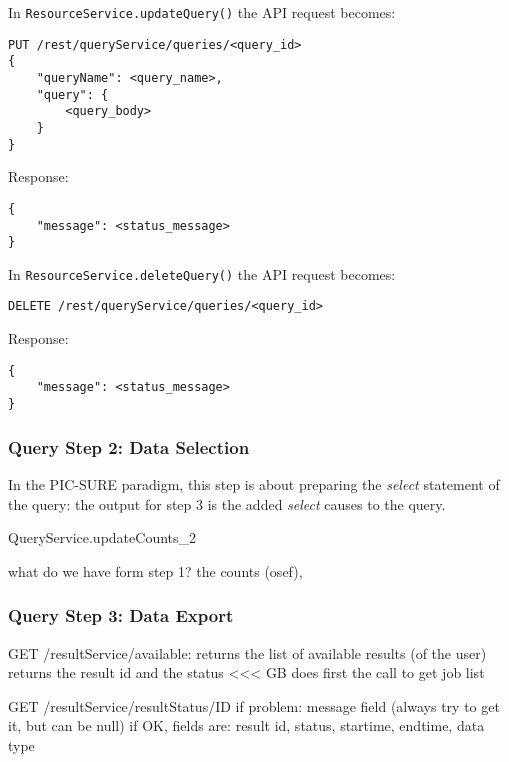 In  \verb|ResourceService.updateQuery()| the API request becomes:
\begin{verbatim}
PUT /rest/queryService/queries/<query_id>
{
    "queryName": <query_name>,
    "query": {
        <query_body>
    }
}
\end{verbatim}

Response:
\begin{verbatim}
{
    "message": <status_message>
} 
\end{verbatim}

In  \verb|ResourceService.deleteQuery()| the API request becomes:
\begin{verbatim}
DELETE /rest/queryService/queries/<query_id>
\end{verbatim}

Response:
\begin{verbatim}
{
    "message": <status_message>
} 
\end{verbatim}


\subsubsection{Query Step 2:  Data Selection}

In the PIC-SURE paradigm, this step is about preparing the \emph{select} statement of the query: the output for step 3 is the added \emph{select} causes to the query.



QueryService.updateCounts_2


what do we have form step 1? the counts (osef), 



\subsubsection{Query Step 3:  Data Export}







GET /resultService/available: returns the list of available results (of the user)
returns the result id and the status
<<< GB does first the call to get job list

GET /resultService/resultStatus/ID
if problem: message field (always try to get it, but can be null)
if OK, fields are: result id, status, startime, endtime, data type

